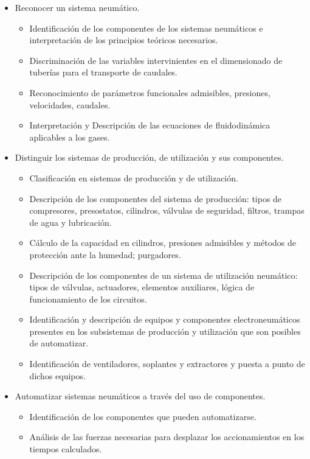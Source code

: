 \documentclass[planificacion.tex]{subfiles}
\begin{document}
\begin{enumerate}
    \begin{itemize}
        \item Reconocer un sistema neumático.
        \begin{itemize}
            \item Identificación de los componentes de los sistemas neumáticos e interpretación de los principios teóricos necesarios.
            \item Discriminación de las variables intervinientes en el dimensionado de tuberías para el transporte de caudales.
            \item Reconocimiento de parámetros funcionales admisibles, presiones, velocidades, caudales.
            \item Interpretación y Descripción de las ecuaciones de fluidodinámica aplicables a los gases. 
        \end{itemize}
        \item Distinguir los sistemas de producción, de utilización y sus componentes.
        \begin{itemize}
            \item Clasificación en sistemas de producción y de utilización.
            \item Descripción de los componentes del sistema de producción: tipos de compresores, presostatos, cilindros, válvulas de seguridad, filtros, trampas de agua y lubricación.
            \item Cálculo de la capacidad en cilindros, presiones admisibles y métodos de protección ante la humedad; purgadores.
            \item Descripción de los componentes de un sistema de utilización neumático: tipos de válvulas, actuadores, elementos auxiliares, lógica de funcionamiento de los circuitos.
            \item Identificación y descripción de equipos y componentes electroneumáticos presentes en los subsistemas de producción y utilización que son posibles de automatizar.
            \item Identificación de ventiladores, soplantes y extractores y puesta a punto de dichos equipos. 
        \end{itemize}
    \item Automatizar sistemas neumáticos a través del uso de componentes. 
        \begin{itemize}
        \item Identificación de los componentes que pueden automatizarse.
        \item Análisis de las fuerzas necesarias para desplazar los accionamientos en los tiempos calculados.

\end{itemize}
\end{itemize}
\end{enumerate}
\end{document}
